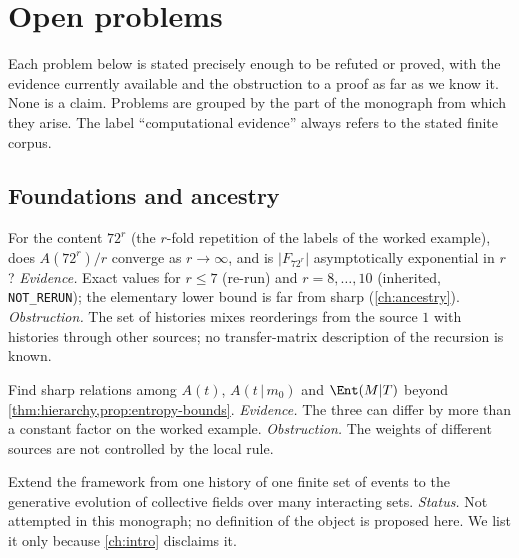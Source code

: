 \chapter{Open problems}\label{ch:open}

Each problem below is stated precisely enough to be refuted or proved, with the evidence currently available and the obstruction to a proof as far as we know it. None is a claim. Problems are grouped by the part of the monograph from which they arise. The label ``computational evidence'' always refers to the stated finite corpus.

\section{Foundations and ancestry}
\begin{problem}\label{prob:growth}
For the content $72^r$ (the $r$-fold repetition of the labels of the worked example), does $A(72^r)/r$ converge as $r\to\infty$, and is $|F_{72^r}|$ asymptotically exponential in $r$? \emph{Evidence.} Exact values for $r\le7$ (re-run) and $r=8,\dots,10$ (inherited, \texttt{NOT\_RERUN}); the elementary lower bound is far from sharp (\cref{ch:ancestry}). \emph{Obstruction.} The set of histories mixes reorderings from the source $1$ with histories through other sources; no transfer-matrix description of the recursion is known.
\end{problem}
\begin{problem}\label{prob:source}
Find sharp relations among $A(t)$, $A(t\,|\,m_0)$ and $\Ent(M|T)$ beyond \cref{thm:hierarchy,prop:entropy-bounds}. \emph{Evidence.} The three can differ by more than a constant factor on the worked example. \emph{Obstruction.} The weights of different sources are not controlled by the local rule.
\end{problem}
\begin{problem}\label{prob:evolution}
Extend the framework from one history of one finite set of events to the generative evolution of collective fields over many interacting sets. \emph{Status.} Not attempted in this monograph; no definition of the object is proposed here. We list it only because \cref{ch:intro} disclaims it.
\end{problem}

